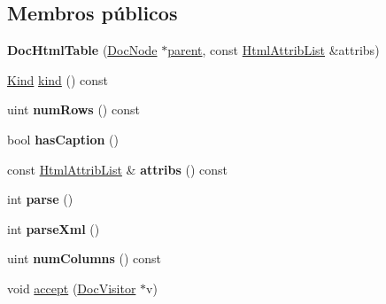 \subsection*{Membros públicos}
\begin{DoxyCompactItemize}
\item 
\hypertarget{class_doc_html_table_ab8ecf9614fa201ed80eee21e854dea5e}{{\bfseries Doc\-Html\-Table} (\hyperlink{class_doc_node}{Doc\-Node} $\ast$\hyperlink{class_doc_node_abd7f070d6b0a38b4da71c2806578d19d}{parent}, const \hyperlink{class_html_attrib_list}{Html\-Attrib\-List} \&attribs)}\label{class_doc_html_table_ab8ecf9614fa201ed80eee21e854dea5e}

\item 
\hyperlink{class_doc_node_aa10c9e8951b8ccf714a59ec321bdac5b}{Kind} \hyperlink{class_doc_html_table_aa9d037bed9f9a083d0cd01485637d843}{kind} () const 
\item 
\hypertarget{class_doc_html_table_af5dbc46a07c66cfaec7d20b49f094ce5}{uint {\bfseries num\-Rows} () const }\label{class_doc_html_table_af5dbc46a07c66cfaec7d20b49f094ce5}

\item 
\hypertarget{class_doc_html_table_ace0ce23c9f57e5f9760e58f715154f6f}{bool {\bfseries has\-Caption} ()}\label{class_doc_html_table_ace0ce23c9f57e5f9760e58f715154f6f}

\item 
\hypertarget{class_doc_html_table_aae3c838ea3d3273b35d07e9965a8985e}{const \hyperlink{class_html_attrib_list}{Html\-Attrib\-List} \& {\bfseries attribs} () const }\label{class_doc_html_table_aae3c838ea3d3273b35d07e9965a8985e}

\item 
\hypertarget{class_doc_html_table_a67007fc2be130666fbf3b065022756f4}{int {\bfseries parse} ()}\label{class_doc_html_table_a67007fc2be130666fbf3b065022756f4}

\item 
\hypertarget{class_doc_html_table_a80866a0f93fec97bbcf5b54a48fd8ead}{int {\bfseries parse\-Xml} ()}\label{class_doc_html_table_a80866a0f93fec97bbcf5b54a48fd8ead}

\item 
\hypertarget{class_doc_html_table_a306b318fcd13f893d7fa776a853a1948}{uint {\bfseries num\-Columns} () const }\label{class_doc_html_table_a306b318fcd13f893d7fa776a853a1948}

\item 
void \hyperlink{class_doc_html_table_a7ba716e854ae2f8f87a4eb2140e302b6}{accept} (\hyperlink{class_doc_visitor}{Doc\-Visitor} $\ast$v)
\end{DoxyCompactItemize}
